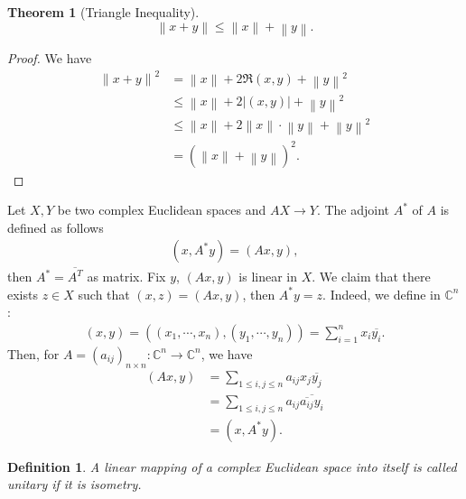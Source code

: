 \documentclass[10pt]{book}
\newtheorem{definition}{Definition}[chapter]
\newtheorem{theorem}{Theorem}[chapter]
\theoremstyle{definition}
\numberwithin{equation}{chapter}
\begin{document}
\medskip

\begin{theorem}[Triangle Inequality]
$$\left\|x+y\right\| \leq \left\|x\right\| + \left\|y\right\|.$$
\end{theorem}
\begin{proof}
We have
\begin{align*}
    \left\|x+y\right\|^2 & = \left\|x\right\| + 2 \Re(x,y) + \left\|y\right\|^2 \\
    & \leq \left\|x\right\| + 2\left|(x,y)\right| + \left\|y\right\|^2 \\
    & \leq \left\|x\right\| + 2 \left\|x\right\| \cdot \left\|y\right\| + \left\|y\right\|^2 \\
    & = (\left\|x\right\| + \left\|y\right\|)^2.
\end{align*}
\end{proof}

\medskip

Let $X, Y$ be two complex Euclidean spaces and $AX\to Y$. The adjoint $A^*$ of $A$ is defined as follows 
\begin{align*}
    (x, A^* y) = (Ax, y),
\end{align*}
then $A^* = \overline{A^T}$ as matrix. Fix $y$, $(Ax, y)$ is linear in $X$. We claim that there exists $z\in X$ such that $(x,z) = (Ax, y)$, then $A^* y = z$. Indeed, we define in $\mathbb{C}^n$:
\begin{align*}
    (x,y) = \left((x_1,\cdots,x_n), (y_1,\cdots,y_n)\right) = \sum^n_{i=1}x_i \overline{y_i}.
\end{align*}
Then, for $A = (a_{ij})_{n\times n}:\mathbb{C}^n \to \mathbb{C}^n$, we have
\begin{align*}
    (Ax, y) & = \sum_{1\leq i,j\leq n}a_{ij} x_j \overline{y_j} \\
    & = \sum_{1\leq i,j\leq n}a_{ij} \overline{\overline{a_{ij}} y_i} \\
    & = (x, A^* y).
\end{align*}

\medskip

\begin{definition}
A linear mapping of a complex Euclidean space into itself is called unitary if it is isometry.
\end{definition}

\medskip
\end{document}
